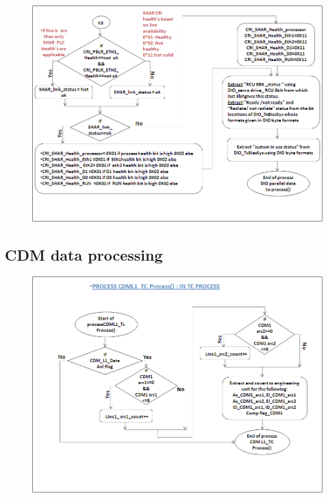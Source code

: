 \begin{figure}[H]
	\centering
	\includegraphics[width=\linewidth]{./FlowCharts/PngFlowCharts/TCP7.png}
\end{figure}

\subsection{CDM data processing}
\begin{figure}[H]
	\centering
	\includegraphics[width=\linewidth]{./FlowCharts/PngFlowCharts/TCP8.png}
\end{figure}

